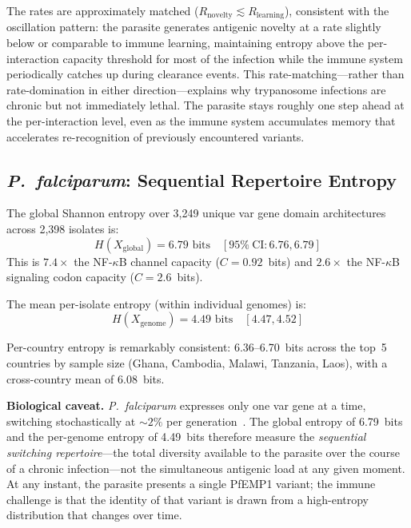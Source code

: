 \documentclass[twocolumn,10pt]{article}
\begin{document}
The rates are approximately matched ($R_{\text{novelty}} \lesssim R_{\text{learning}}$), consistent with the oscillation pattern: the parasite generates antigenic novelty at a rate slightly below or comparable to immune learning, maintaining entropy above the per-interaction capacity threshold for most of the infection while the immune system periodically catches up during clearance events.  This rate-matching---rather than rate-domination in either direction---explains why trypanosome infections are chronic but not immediately lethal.  The parasite stays roughly one step ahead at the per-interaction level, even as the immune system accumulates memory that accelerates re-recognition of previously encountered variants.

\subsection{\textit{P.~falciparum}: Sequential Repertoire Entropy}
\label{sec:pfalciparum}

The global Shannon entropy over 3,249 unique var gene domain architectures across 2,398 isolates is:
\begin{equation}
H(X_{\text{global}}) = 6.79 \text{~bits} \quad [95\%~\text{CI}: 6.76, 6.79]
\end{equation}
This is $7.4\times$ the NF-$\kappa$B channel capacity ($C = 0.92$~bits) and $2.6\times$ the NF-$\kappa$B signaling codon capacity ($C = 2.6$~bits).

The mean per-isolate entropy (within individual genomes) is:
\begin{equation}
H(X_{\text{genome}}) = 4.49 \text{~bits} \quad [4.47, 4.52]
\end{equation}

Per-country entropy is remarkably consistent: 6.36--6.70~bits across the top~5 countries by sample size (Ghana, Cambodia, Malawi, Tanzania, Laos), with a cross-country mean of 6.08~bits.

\textbf{Biological caveat.}  \textit{P.~falciparum} expresses only one var gene at a time, switching stochastically at ${\sim}2\%$ per generation~\citep{horrocks2004}.  The global entropy of 6.79~bits and the per-genome entropy of 4.49~bits therefore measure the \emph{sequential switching repertoire}---the total diversity available to the parasite over the course of a chronic infection---not the simultaneous antigenic load at any given moment.  At any instant, the parasite presents a single PfEMP1 variant; the immune challenge is that the identity of that variant is drawn from a high-entropy distribution that changes over time.
\end{document}
